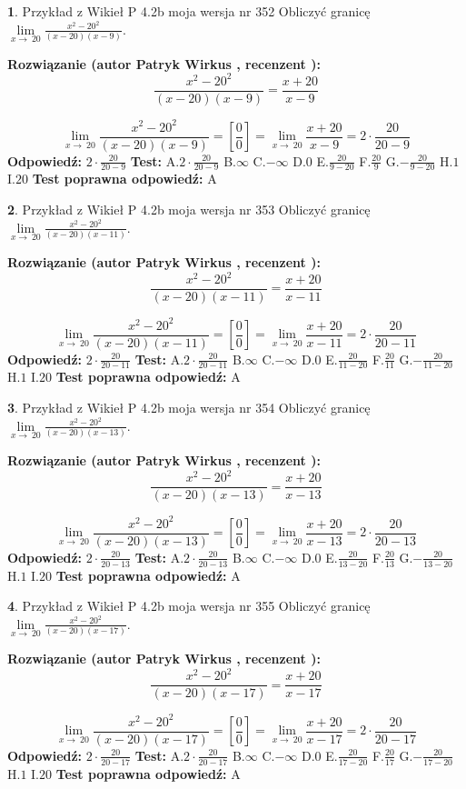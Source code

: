 \documentclass[12pt, a4paper]{article}
\theoremstyle{definition} %
\newtheorem{zad}{}
\newcommand{\zadStart}[1]{\begin{zad}#1\newline}
\newcommand{\zadStop}{\end{zad}}
\newcommand{\rozwStart}[2]{\noindent \textbf{Rozwiązanie (autor #1 , recenzent #2): }\newline}
\newcommand{\rozwStop}{\newline}
\newcommand{\odpStart}{\noindent \textbf{Odpowiedź:}\newline}
\newcommand{\odpStop}{\newline}
\newcommand{\testStart}{\noindent \textbf{Test:}\newline}
\newcommand{\testStop}{\newline}
\newcommand{\kluczStart}{\noindent \textbf{Test poprawna odpowiedź:}\newline}
\newcommand{\kluczStop}{\newline}
\begin{document}
\zadStart{Przykład z Wikieł P 4.2b moja wersja nr 352}
Obliczyć granicę $\lim\limits_{x\to\ 20}\frac{x^{2}-20^{2}}{(x-20)(x-9)}$.
\zadStop
\rozwStart{Patryk Wirkus}{}
$$\frac{x^{2}-20^{2}}{(x-20)(x-9)}=\frac{x+20}{x-9}$$

$$\lim\limits_{x\to\ 20}\frac{x^{2}-20^{2}}{(x-20)(x-9)}=[\frac{0}{0}]=\lim\limits_{x\to\ 20}\frac{x+20}{x-9}=2 \cdot \frac{20}{20-9}$$
\rozwStop
\odpStart
$2 \cdot \frac{20}{20-9}$
\odpStop
\testStart
A.$2 \cdot \frac{20}{20-9}$
B.$\infty$
C.$-\infty$
D.$0$
E.$\frac{20}{9-20}$
F.$\frac{20}{9}$
G.$-\frac{20}{9-20}$
H.$1$
I.$20$
\testStop
\kluczStart
A
\kluczStop



\zadStart{Przykład z Wikieł P 4.2b moja wersja nr 353}
Obliczyć granicę $\lim\limits_{x\to\ 20}\frac{x^{2}-20^{2}}{(x-20)(x-11)}$.
\zadStop
\rozwStart{Patryk Wirkus}{}
$$\frac{x^{2}-20^{2}}{(x-20)(x-11)}=\frac{x+20}{x-11}$$

$$\lim\limits_{x\to\ 20}\frac{x^{2}-20^{2}}{(x-20)(x-11)}=[\frac{0}{0}]=\lim\limits_{x\to\ 20}\frac{x+20}{x-11}=2 \cdot \frac{20}{20-11}$$
\rozwStop
\odpStart
$2 \cdot \frac{20}{20-11}$
\odpStop
\testStart
A.$2 \cdot \frac{20}{20-11}$
B.$\infty$
C.$-\infty$
D.$0$
E.$\frac{20}{11-20}$
F.$\frac{20}{11}$
G.$-\frac{20}{11-20}$
H.$1$
I.$20$
\testStop
\kluczStart
A
\kluczStop



\zadStart{Przykład z Wikieł P 4.2b moja wersja nr 354}
Obliczyć granicę $\lim\limits_{x\to\ 20}\frac{x^{2}-20^{2}}{(x-20)(x-13)}$.
\zadStop
\rozwStart{Patryk Wirkus}{}
$$\frac{x^{2}-20^{2}}{(x-20)(x-13)}=\frac{x+20}{x-13}$$

$$\lim\limits_{x\to\ 20}\frac{x^{2}-20^{2}}{(x-20)(x-13)}=[\frac{0}{0}]=\lim\limits_{x\to\ 20}\frac{x+20}{x-13}=2 \cdot \frac{20}{20-13}$$
\rozwStop
\odpStart
$2 \cdot \frac{20}{20-13}$
\odpStop
\testStart
A.$2 \cdot \frac{20}{20-13}$
B.$\infty$
C.$-\infty$
D.$0$
E.$\frac{20}{13-20}$
F.$\frac{20}{13}$
G.$-\frac{20}{13-20}$
H.$1$
I.$20$
\testStop
\kluczStart
A
\kluczStop



\zadStart{Przykład z Wikieł P 4.2b moja wersja nr 355}
Obliczyć granicę $\lim\limits_{x\to\ 20}\frac{x^{2}-20^{2}}{(x-20)(x-17)}$.
\zadStop
\rozwStart{Patryk Wirkus}{}
$$\frac{x^{2}-20^{2}}{(x-20)(x-17)}=\frac{x+20}{x-17}$$

$$\lim\limits_{x\to\ 20}\frac{x^{2}-20^{2}}{(x-20)(x-17)}=[\frac{0}{0}]=\lim\limits_{x\to\ 20}\frac{x+20}{x-17}=2 \cdot \frac{20}{20-17}$$
\rozwStop
\odpStart
$2 \cdot \frac{20}{20-17}$
\odpStop
\testStart
A.$2 \cdot \frac{20}{20-17}$
B.$\infty$
C.$-\infty$
D.$0$
E.$\frac{20}{17-20}$
F.$\frac{20}{17}$
G.$-\frac{20}{17-20}$
H.$1$
I.$20$
\testStop
\kluczStart
A
\kluczStop
\end{document}
